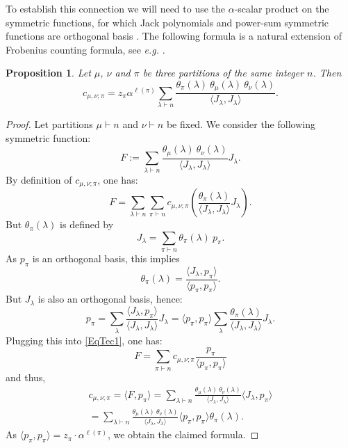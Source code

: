 \documentclass[11pt]{amsart}
\theoremstyle{plain}
\newtheorem{proposition}[lemma]{Proposition}
\theoremstyle{remark}
\begin{document}
To establish this connection we will need to use the $\alpha$-scalar
product on the symmetric functions, for which Jack polynomials and
power-sum symmetric functions are orthogonal basis \cite[(VI,10)]{Macdonald1995}.
The following formula is a natural extension of Frobenius counting formula,
see {\em e.g.} \cite[Appendix, Theorem 2]{LandoZvonkin2004}.
\begin{proposition}\label{PropTripleProduit}
    Let $\mu$, $\nu$ and $\pi$ be three partitions of the same integer $n$.
    Then 
    \[c_{\mu,\nu;\pi} = z_\pi \alpha^{\ell(\pi)} \sum_{\lambda \vdash n}
    \frac{\theta_{\pi}(\lambda)\ \theta_{\mu}(\lambda)\ \theta_{\nu}(\lambda)}{
    \langle J_\lambda, J_\lambda \rangle}. \]
\end{proposition}
\begin{proof}
    Let partitions $\mu\vdash n$ and $\nu\vdash n$ be fixed.
    We consider the following symmetric function:
    \[F:=\sum_{\lambda \vdash n} \frac{\theta_\mu(\lambda)\ \theta_\nu(\lambda)}{
    \langle J_\lambda, J_\lambda \rangle} J_\lambda.\]
    By definition of $c_{\mu,\nu;\pi}$, one has:
    \begin{equation}\label{EqTec1}
        F=\sum_{\lambda \vdash n} \sum_{\pi \vdash n} c_{\mu,\nu;\pi}
    \left( \frac{\theta_\pi(\lambda)}{\langle J_\lambda, J_\lambda \rangle} J_\lambda \right).
    \end{equation}
    But $\theta_\pi(\lambda)$ is defined by
    \[J_\lambda = \sum_{\pi \vdash n} \theta_\pi(\lambda)\ p_\pi.\]
    As $p_\pi$ is an orthogonal basis, this implies
    \[ \theta_\pi(\lambda) = \frac{\langle J_\lambda, p_\pi \rangle}{\langle p_\pi, p_\pi \rangle}.\]
    But $J_\lambda$ is also an orthogonal basis, hence:
    \begin{equation}\label{EqJinP}
        p_\pi = \sum_\lambda \frac{\langle J_\lambda, p_\pi \rangle}{
    \langle J_\lambda, J_\lambda \rangle} J_\lambda =
    \langle p_\pi, p_\pi \rangle \sum_\lambda 
    \frac{\theta_\pi(\lambda)}{\langle J_\lambda, J_\lambda \rangle} J_\lambda.
\end{equation}
        Plugging this into \eqref{EqTec1}, one has:
    \[F=\sum_{\pi \vdash n} c_{\mu,\nu;\pi} \frac{p_\pi}{\langle p_\pi, p_\pi \rangle}\]
    and thus,
    \begin{multline*}
        c_{\mu,\nu;\pi} = \langle F,p_\pi \rangle =
        \sum_{\lambda \vdash n} \frac{\theta_\mu(\lambda)\ \theta_\nu(\lambda)}{        
            \langle J_\lambda, J_\lambda \rangle} \langle J_\lambda,p_\pi \rangle \\
           = \sum_{\lambda \vdash n} \frac{\theta_\mu(\lambda)\ \theta_\nu(\lambda)}{        
            \langle J_\lambda, J_\lambda \rangle}
            \langle p_\pi, p_\pi \rangle \theta_\pi(\lambda).
        \end{multline*}
        As $\langle p_\pi, p_\pi \rangle= z_\pi \cdot \alpha^{\ell(\pi)}$,
        we obtain the claimed formula.
\end{proof}
\end{document}
